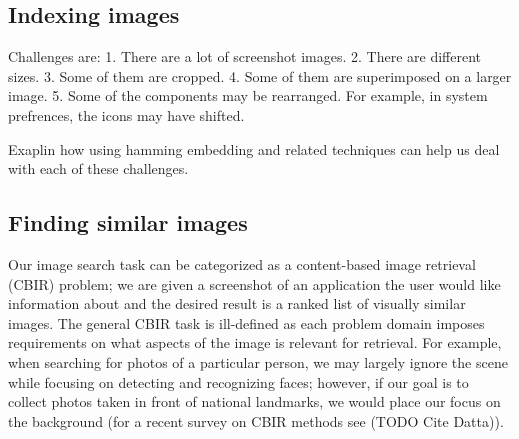 \documentclass{www2010-submission}
\begin{document}
%




\subsection{Indexing images}
Challenges are:
1. There are a lot of screenshot images.
2. There are different sizes.
3. Some of them are cropped.
4. Some of them are superimposed on a larger image.
5. Some of the components may be rearranged. For example,
in system prefrences, the icons may have shifted.

Exaplin how using hamming embedding and related techniques can
help us deal with each of these challenges.

\subsection{Finding similar images}
Our image search task can be categorized as a content-based image
retrieval (CBIR) problem; we are given a screenshot of an application
the user would like information about and the desired result is a
ranked list of visually similar images.  The general CBIR task is
ill-defined as each problem domain imposes requirements on what
aspects of the image is relevant for retrieval.  For example, when
searching for photos of a particular person, we may largely ignore the
scene while focusing on detecting and recognizing faces; however, if
our goal is to collect photos taken in front of national landmarks, we
would place our focus on the background (for a recent survey on CBIR
methods see (TODO Cite Datta)).
\end{document}
